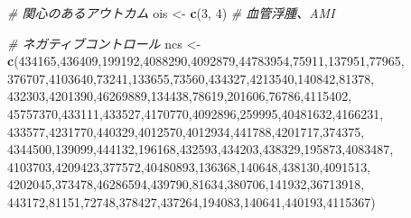 \documentclass[
  11pt]{book}
\newenvironment{Shaded}{\begin{snugshade}}{\end{snugshade}}
\newcommand{\CommentTok}[1]{\textcolor[rgb]{0.56,0.35,0.01}{\textit{#1}}}
\newcommand{\DecValTok}[1]{\textcolor[rgb]{0.00,0.00,0.81}{#1}}
\newcommand{\FunctionTok}[1]{\textcolor[rgb]{0.13,0.29,0.53}{\textbf{#1}}}
\newcommand{\NormalTok}[1]{#1}
\newcommand{\OtherTok}[1]{\textcolor[rgb]{0.56,0.35,0.01}{#1}}
\theoremstyle{definition}
\theoremstyle{definition}
\theoremstyle{definition}
\theoremstyle{definition}
\theoremstyle{remark}
\begin{document}
\begin{Shaded}
\begin{Highlighting}[]
\CommentTok{\# 関心のあるアウトカム}
\NormalTok{ois }\OtherTok{\textless{}{-}} \FunctionTok{c}\NormalTok{(}\DecValTok{3}\NormalTok{, }\DecValTok{4}\NormalTok{) }\CommentTok{\# 血管浮腫、AMI}

\CommentTok{\# ネガティブコントロール}
\NormalTok{ncs }\OtherTok{\textless{}{-}} \FunctionTok{c}\NormalTok{(}\DecValTok{434165}\NormalTok{,}\DecValTok{436409}\NormalTok{,}\DecValTok{199192}\NormalTok{,}\DecValTok{4088290}\NormalTok{,}\DecValTok{4092879}\NormalTok{,}\DecValTok{44783954}\NormalTok{,}\DecValTok{75911}\NormalTok{,}\DecValTok{137951}\NormalTok{,}\DecValTok{77965}\NormalTok{,}
         \DecValTok{376707}\NormalTok{,}\DecValTok{4103640}\NormalTok{,}\DecValTok{73241}\NormalTok{,}\DecValTok{133655}\NormalTok{,}\DecValTok{73560}\NormalTok{,}\DecValTok{434327}\NormalTok{,}\DecValTok{4213540}\NormalTok{,}\DecValTok{140842}\NormalTok{,}\DecValTok{81378}\NormalTok{,}
         \DecValTok{432303}\NormalTok{,}\DecValTok{4201390}\NormalTok{,}\DecValTok{46269889}\NormalTok{,}\DecValTok{134438}\NormalTok{,}\DecValTok{78619}\NormalTok{,}\DecValTok{201606}\NormalTok{,}\DecValTok{76786}\NormalTok{,}\DecValTok{4115402}\NormalTok{,}
         \DecValTok{45757370}\NormalTok{,}\DecValTok{433111}\NormalTok{,}\DecValTok{433527}\NormalTok{,}\DecValTok{4170770}\NormalTok{,}\DecValTok{4092896}\NormalTok{,}\DecValTok{259995}\NormalTok{,}\DecValTok{40481632}\NormalTok{,}\DecValTok{4166231}\NormalTok{,}
         \DecValTok{433577}\NormalTok{,}\DecValTok{4231770}\NormalTok{,}\DecValTok{440329}\NormalTok{,}\DecValTok{4012570}\NormalTok{,}\DecValTok{4012934}\NormalTok{,}\DecValTok{441788}\NormalTok{,}\DecValTok{4201717}\NormalTok{,}\DecValTok{374375}\NormalTok{,}
         \DecValTok{4344500}\NormalTok{,}\DecValTok{139099}\NormalTok{,}\DecValTok{444132}\NormalTok{,}\DecValTok{196168}\NormalTok{,}\DecValTok{432593}\NormalTok{,}\DecValTok{434203}\NormalTok{,}\DecValTok{438329}\NormalTok{,}\DecValTok{195873}\NormalTok{,}\DecValTok{4083487}\NormalTok{,}
         \DecValTok{4103703}\NormalTok{,}\DecValTok{4209423}\NormalTok{,}\DecValTok{377572}\NormalTok{,}\DecValTok{40480893}\NormalTok{,}\DecValTok{136368}\NormalTok{,}\DecValTok{140648}\NormalTok{,}\DecValTok{438130}\NormalTok{,}\DecValTok{4091513}\NormalTok{,}
         \DecValTok{4202045}\NormalTok{,}\DecValTok{373478}\NormalTok{,}\DecValTok{46286594}\NormalTok{,}\DecValTok{439790}\NormalTok{,}\DecValTok{81634}\NormalTok{,}\DecValTok{380706}\NormalTok{,}\DecValTok{141932}\NormalTok{,}\DecValTok{36713918}\NormalTok{,}
         \DecValTok{443172}\NormalTok{,}\DecValTok{81151}\NormalTok{,}\DecValTok{72748}\NormalTok{,}\DecValTok{378427}\NormalTok{,}\DecValTok{437264}\NormalTok{,}\DecValTok{194083}\NormalTok{,}\DecValTok{140641}\NormalTok{,}\DecValTok{440193}\NormalTok{,}\DecValTok{4115367}\NormalTok{)}


\end{Highlighting}
\end{Shaded}
\end{document}
